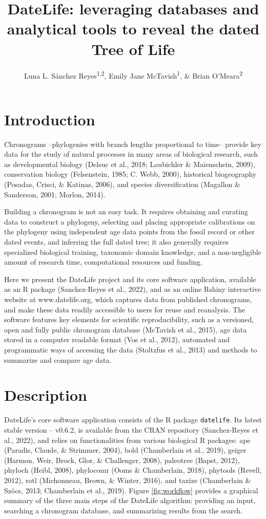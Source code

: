 \documentclass[
  english,
  man]{apa6}
\title{DateLife: leveraging databases and analytical tools to reveal the dated Tree of Life}
\author{Luna L. Sánchez Reyes\textsuperscript{1,2}, Emily Jane McTavish\textsuperscript{1}, \& Brian O'Meara\textsuperscript{2}}
\date{}
\affiliation{\vspace{0.5cm}\textsuperscript{1} University of California, Merced\\\textsuperscript{2} University of Tennessee, Knoxville}
\begin{document}
\maketitle

\hypertarget{introduction}{%
\section{Introduction}\label{introduction}}

Chronograms --phylogenies with branch lengths proportional to time-- provide key data for the study of natural processes in many areas of biological research, such as developmental biology (Delsuc et al., 2018; Laubichler \& Maienschein, 2009), conservation biology (Felsenstein, 1985; C. Webb, 2000), historical biogeography (Posadas, Crisci, \& Katinas, 2006), and species diversification (Magallon \& Sanderson, 2001; Morlon, 2014).

Building a chronogram is not an easy task.
It requires obtaining and curating data to construct a phylogeny, selecting and placing appropriate calibrations on the phylogeny using independent age data points from the fossil record or other dated events, and inferring the full dated tree;
it also generally requires specialized biological training, taxonomic domain knowledge, and a non-negligible amount of research time, computational resources and funding.

Here we present the DateLife project and its core software application, available as an R package (Sanchez-Reyes et al., 2022), and as an online Rshiny interactive website at www.datelife.org, which captures data from published chronograms, and make these data readily accessible to users for reuse and reanalysis.
The software features key elements for scientific reproducibility, such as a versioned, open and fully public chronogram database (McTavish et al., 2015), age data stored in a computer readable format (Vos et al., 2012), automated and programmatic ways of accessing the data (Stoltzfus et al., 2013) and methods to summarize and compare age data.

\hypertarget{description}{%
\section{Description}\label{description}}

DateLife's core software application consists of the R package \texttt{datelife}. Its latest stable version -- v0.6.2, is available from the CRAN repository (Sanchez-Reyes et al., 2022), and relies on functionalities from various biological R packages:
ape (Paradis, Claude, \& Strimmer, 2004),
bold (Chamberlain et al., 2019),
geiger (Harmon, Weir, Brock, Glor, \& Challenger, 2008),
paleotree (Bapst, 2012),
phyloch (Heibl, 2008),
phylocomr (Ooms \& Chamberlain, 2018),
phytools (Revell, 2012),
rotl (Michonneau, Brown, \& Winter, 2016), and
taxize (Chamberlain \& Szöcs, 2013; Chamberlain et al., 2019).
Figure \ref{fig:workflow} provides a graphical summary of the three main steps of the DateLife algorithm: providing an input, searching a chronogram database, and summarizing results from the search.
\end{document}
